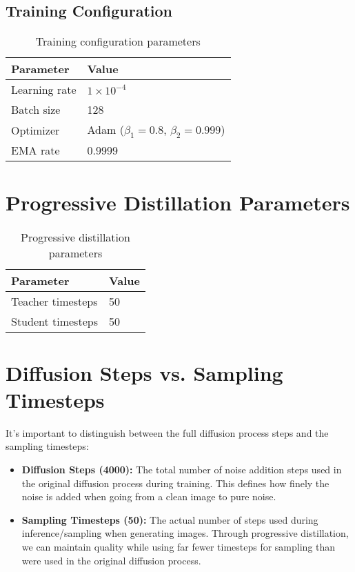 \documentclass{article}
\begin{document}
\subsection{Training Configuration}
\begin{table}[h]
\centering
\begin{tabular}{ll}
\toprule
\textbf{Parameter} & \textbf{Value} \\
\midrule
Learning rate & $1 \times 10^{-4}$ \\
Batch size & 128 \\
Optimizer & Adam ($\beta_1=0.8$, $\beta_2=0.999$) \\
EMA rate & 0.9999 \\
\bottomrule
\end{tabular}
\caption{Training configuration parameters}
\label{tab:training_config}
\end{table}

\section{Progressive Distillation Parameters}
\begin{table}[h]
\centering
\begin{tabular}{ll}
\toprule
\textbf{Parameter} & \textbf{Value} \\
\midrule
Teacher timesteps & 50 \\
Student timesteps & 50 \\
\bottomrule
\end{tabular}
\caption{Progressive distillation parameters}
\label{tab:distillation_params}
\end{table}

\section{Diffusion Steps vs. Sampling Timesteps}
It's important to distinguish between the full diffusion process steps and the sampling timesteps:

\begin{itemize}
\item \textbf{Diffusion Steps (4000):} The total number of noise addition steps used in the original diffusion process during training. This defines how finely the noise is added when going from a clean image to pure noise.

\item \textbf{Sampling Timesteps (50):} The actual number of steps used during inference/sampling when generating images. Through progressive distillation, we can maintain quality while using far fewer timesteps for sampling than were used in the original diffusion process.
\end{itemize}
\end{document}

